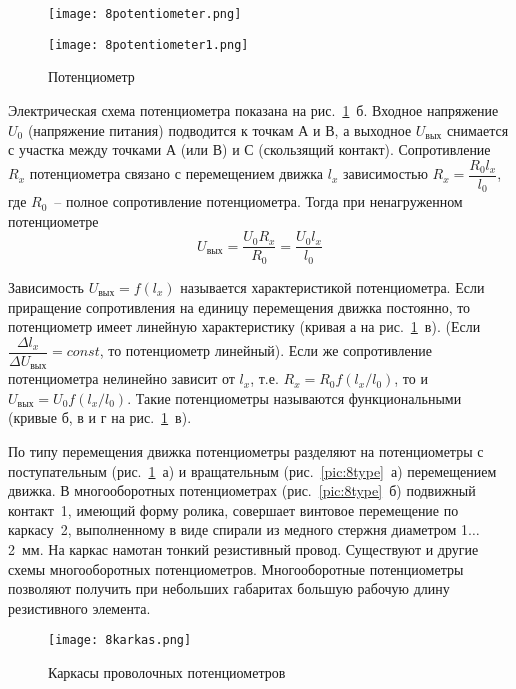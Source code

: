 \begin{figure}[h!]
	\texttt{[image: 8potentiometer.png]}
	\label{pic:8potentiometer}
\end{figure}

\begin{figure}[h!]
	\caption{ Потенциометр }
	\texttt{[image: 8potentiometer1.png]}
	\label{pic:8potentiometer1}
\end{figure}

Электрическая схема потенциометра показана на рис.~\ref{pic:8potentiometer}~б. Входное напряжение $ U_0 $ (напряжение питания) подводится к точкам А и В, а выходное $ U_\text{вых} $ снимается с участка между точками А (или В) и С (скользящий контакт). Сопротивление $ R_x $ потенциометра связано с перемещением движка $ l_x $ зависимостью $ R_x = \dfrac{R_0l_x}{l_0} $, где $ R_0 $~-- полное сопротивление потенциометра. Тогда при ненагруженном потенциометре
\[ U_\text{вых} = \dfrac{U_0 R_x}{R_0} = \dfrac{U_0 l_x}{l_0} \]

Зависимость $ U_\text{вых} = f(l_x) $ называется характеристикой потенциометра. Если приращение сопротивления на единицу перемещения движка постоянно, то потенциометр имеет линейную характеристику (кривая а на рис.~\ref{pic:8potentiometer}~в). (Если $ \dfrac{\Delta l_x}{\Delta U_\text{вых}} = const $, то потенциометр линейный). Если же сопротивление потенциометра нелинейно зависит от $ l_x $, т.е. $ R_x = R_0 f(l_x/l_0) $, то и $ U_\text{вых} = U_0 f(l_x/l_0) $. Такие потенциометры называются функциональными (кривые б, в и г на рис.~\ref{pic:8potentiometer}~в).

По типу перемещения движка потенциометры разделяют на потенциометры с поступательным (рис.~\ref{pic:8potentiometer}~а) и вращательным (рис.~\ref{pic:8type}~а) перемещением движка. В многооборотных потенциометрах (рис.~\ref{pic:8type}~б) подвижный контакт~1, имеющий форму ролика, совершает винтовое перемещение по каркасу~2, выполненному в виде спирали из медного стержня диаметром 1$ \ldots $2~мм. На каркас намотан тонкий резистивный провод. Существуют и другие схемы многооборотных потенциометров. Многооборотные потенциометры позволяют получить при небольших габаритах большую рабочую длину резистивного элемента.

\begin{figure}[h!]
	\caption{ Каркасы проволочных потенциометров }
	\texttt{[image: 8karkas.png]}
	\label{pic:8karkas}
\end{figure}

